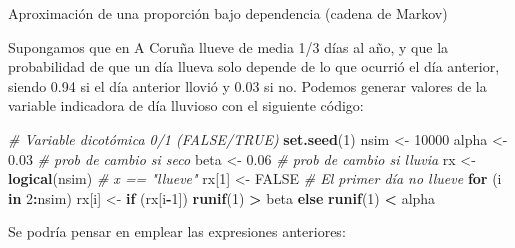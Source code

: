 \documentclass[]{book}
\newenvironment{Shaded}{\begin{snugshade}}{\end{snugshade}}
\newcommand{\KeywordTok}[1]{\textcolor[rgb]{0.13,0.29,0.53}{\textbf{#1}}}
\newcommand{\DecValTok}[1]{\textcolor[rgb]{0.00,0.00,0.81}{#1}}
\newcommand{\FloatTok}[1]{\textcolor[rgb]{0.00,0.00,0.81}{#1}}
\newcommand{\StringTok}[1]{\textcolor[rgb]{0.31,0.60,0.02}{#1}}
\newcommand{\CommentTok}[1]{\textcolor[rgb]{0.56,0.35,0.01}{\textit{#1}}}
\newcommand{\OtherTok}[1]{\textcolor[rgb]{0.56,0.35,0.01}{#1}}
\newcommand{\ControlFlowTok}[1]{\textcolor[rgb]{0.13,0.29,0.53}{\textbf{#1}}}
\newcommand{\OperatorTok}[1]{\textcolor[rgb]{0.81,0.36,0.00}{\textbf{#1}}}
\newcommand{\NormalTok}[1]{#1}
\theoremstyle{definition}
\theoremstyle{definition}
\theoremstyle{definition}
\theoremstyle{remark}
\let\BeginKnitrBlock\begin \let\EndKnitrBlock\end
\begin{document}
\BeginKnitrBlock{example}
\protect\hypertarget{exm:unnamed-chunk-11}{}{\label{exm:unnamed-chunk-11}
}Aproximación de una proporción bajo dependencia (cadena de Markov)
\EndKnitrBlock{example} Supongamos que en A Coruña llueve de media 1/3
días al año, y que la probabilidad de que un día llueva solo depende de
lo que ocurrió el día anterior, siendo 0.94 si el día anterior llovió y
0.03 si no. Podemos generar valores de la variable indicadora de día
lluvioso con el siguiente código:

\begin{Shaded}
\begin{Highlighting}[]
\CommentTok{# Variable dicotómica 0/1 (FALSE/TRUE)  }
\KeywordTok{set.seed}\NormalTok{(}\DecValTok{1}\NormalTok{)}
\NormalTok{nsim <-}\StringTok{ }\DecValTok{10000}
\NormalTok{alpha <-}\StringTok{ }\FloatTok{0.03} \CommentTok{# prob de cambio si seco}
\NormalTok{beta <-}\StringTok{ }\FloatTok{0.06}  \CommentTok{# prob de cambio si lluvia}
\NormalTok{rx <-}\StringTok{ }\KeywordTok{logical}\NormalTok{(nsim) }\CommentTok{# x == "llueve"}
\NormalTok{rx[}\DecValTok{1}\NormalTok{] <-}\StringTok{ }\OtherTok{FALSE} \CommentTok{# El primer día no llueve}
\ControlFlowTok{for}\NormalTok{ (i }\ControlFlowTok{in} \DecValTok{2}\OperatorTok{:}\NormalTok{nsim)}
\NormalTok{  rx[i] <-}\StringTok{ }\ControlFlowTok{if}\NormalTok{ (rx[i}\OperatorTok{-}\DecValTok{1}\NormalTok{]) }\KeywordTok{runif}\NormalTok{(}\DecValTok{1}\NormalTok{) }\OperatorTok{>}\StringTok{ }\NormalTok{beta }\ControlFlowTok{else} \KeywordTok{runif}\NormalTok{(}\DecValTok{1}\NormalTok{) }\OperatorTok{<}\StringTok{ }\NormalTok{alpha}
\end{Highlighting}
\end{Shaded}

Se podría pensar en emplear las expresiones anteriores:
\end{document}
